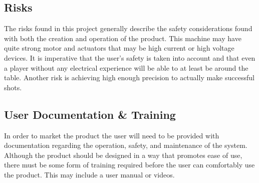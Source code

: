 \documentclass[titlepage]{article}
\begin{document}
\subsection{Risks}
The risks found in this project generally describe the safety considerations found with both the creation and operation of the product. This machine may have quite strong motor and actuators that may be high current or high voltage devices. It is imperative that the user's safety is taken into account and that even a player without any electrical experience will be able to at least be around the table. Another risk is achieving high enough precision to actually make successful shots.

\subsection{User Documentation \& Training}
In order to market the product the user will need to be provided with documentation regarding the operation, safety, and maintenance of the system. Although the product should be designed in a way that promotes ease of use, there must be some form of training required before the user can comfortably use the product. This may include a user manual or videos.
\end{document}
